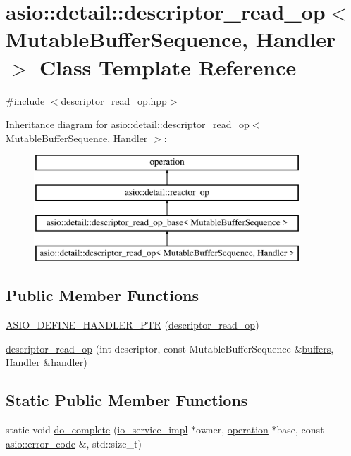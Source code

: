 \hypertarget{classasio_1_1detail_1_1descriptor__read__op}{}\section{asio\+:\+:detail\+:\+:descriptor\+\_\+read\+\_\+op$<$ Mutable\+Buffer\+Sequence, Handler $>$ Class Template Reference}
\label{classasio_1_1detail_1_1descriptor__read__op}


{\ttfamily \#include $<$descriptor\+\_\+read\+\_\+op.\+hpp$>$}

Inheritance diagram for asio\+:\+:detail\+:\+:descriptor\+\_\+read\+\_\+op$<$ Mutable\+Buffer\+Sequence, Handler $>$\+:\begin{figure}[H]
\begin{center}
\leavevmode
\includegraphics[height=4.000000cm]{classasio_1_1detail_1_1descriptor__read__op}
\end{center}
\end{figure}
\subsection*{Public Member Functions}
\begin{DoxyCompactItemize}
\item 
\hyperlink{classasio_1_1detail_1_1descriptor__read__op_ac501a87d81bfc7290a350358455ec4f7}{A\+S\+I\+O\+\_\+\+D\+E\+F\+I\+N\+E\+\_\+\+H\+A\+N\+D\+L\+E\+R\+\_\+\+P\+T\+R} (\hyperlink{classasio_1_1detail_1_1descriptor__read__op}{descriptor\+\_\+read\+\_\+op})
\item 
\hyperlink{classasio_1_1detail_1_1descriptor__read__op_ae7f5eb315ea37563616c7d92dea8bd3c}{descriptor\+\_\+read\+\_\+op} (int descriptor, const Mutable\+Buffer\+Sequence \&\hyperlink{group__async__read_ga54dede45c3175148a77fe6635222c47d}{buffers}, Handler \&handler)
\end{DoxyCompactItemize}
\subsection*{Static Public Member Functions}
\begin{DoxyCompactItemize}
\item 
static void \hyperlink{classasio_1_1detail_1_1descriptor__read__op_a7648551b3bf757f7a2610d17d0a00b1d}{do\+\_\+complete} (\hyperlink{namespaceasio_1_1detail_a6d61d9b8e53c11288be549d82aec5a42}{io\+\_\+service\+\_\+impl} $\ast$owner, \hyperlink{namespaceasio_1_1detail_a338968609bec20e37145309f8f9ec936}{operation} $\ast$base, const \hyperlink{classasio_1_1error__code}{asio\+::error\+\_\+code} \&, std\+::size\+\_\+t)
\end{DoxyCompactItemize}
